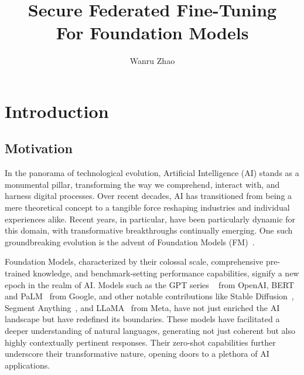 \documentclass[withindex,glossary,firstyr]{cam-thesis}
\title{Secure Federated Fine-Tuning \\ For Foundation Models}
\author{Wanru Zhao}
\begin{document}

\frontmatter{}



\chapter{Introduction}



\section{Motivation}

In the panorama of technological evolution, Artificial Intelligence (AI) stands as a monumental pillar, transforming the way we comprehend, interact with, and harness digital processes. Over recent decades, AI has transitioned from being a mere theoretical concept to a tangible force reshaping industries and individual experiences alike. Recent years, in particular, have been particularly dynamic for this domain, with transformative breakthroughs continually emerging. One such groundbreaking evolution is the advent of Foundation Models (FM)~\cite{BHAA+21}.

Foundation Models, characterized by their colossal scale, comprehensive pre-trained knowledge, and benchmark-setting performance capabilities, signify a new epoch in the realm of AI. Models such as the GPT series ~\cite{zhang2023gptfl} from OpenAI, BERT~\cite{mBERT} and PaLM~\cite{anil2023palm} from Google, and other notable contributions like Stable Diffusion~\cite{rombach2021highresolution}, Segment Anything~\cite{kirillov2023segany}, and LLaMA~\cite{touvron2023llama, touvron2023llama2} from Meta, have not just enriched the AI landscape but have redefined its boundaries. These models have facilitated a deeper understanding of natural languages, generating not just coherent but also highly contextually pertinent responses. Their zero-shot capabilities further underscore their transformative nature, opening doors to a plethora of AI applications.
\end{document}
